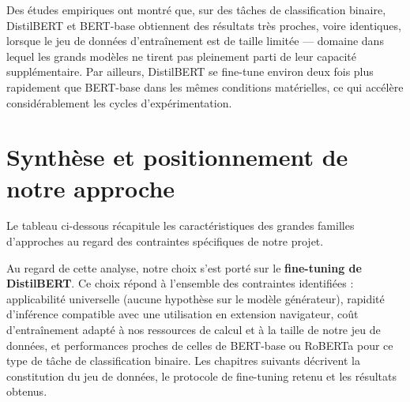 ﻿\documentclass[12pt, a4paper]{report}
\begin{document}
Des études empiriques ont montré que, sur des tâches de classification binaire, 
DistilBERT et BERT-base obtiennent des résultats très proches, voire identiques, 
lorsque le jeu de données d'entraînement est de taille limitée — domaine dans 
lequel les grands modèles ne tirent pas pleinement parti de leur capacité 
supplémentaire. Par ailleurs, DistilBERT se fine-tune environ deux fois plus 
rapidement que BERT-base dans les mêmes conditions matérielles, ce qui accélère 
considérablement les cycles d'expérimentation.

\section{Synthèse et positionnement de notre approche}

Le tableau ci-dessous récapitule les caractéristiques des grandes familles 
d'approches au regard des contraintes spécifiques de notre projet.

\begin{table}[H]
\centering
{}
\caption{Comparaison des approches de détection selon les contraintes du projet. 
(*) Uniquement si le texte a été tatoué au préalable.}
\label{tab:comparaison}
\end{table}

Au regard de cette analyse, notre choix s'est porté sur le \textbf{fine-tuning 
de DistilBERT}. Ce choix répond à l'ensemble des contraintes identifiées : 
applicabilité universelle (aucune hypothèse sur le modèle générateur), rapidité 
d'inférence compatible avec une utilisation en extension navigateur, coût 
d'entraînement adapté à nos ressources de calcul et à la taille de notre jeu de 
données, et performances proches de celles de BERT-base ou RoBERTa pour ce 
type de tâche de classification binaire. Les chapitres suivants décrivent la 
constitution du jeu de données, le protocole de fine-tuning retenu et les 
résultats obtenus.
\end{document}
